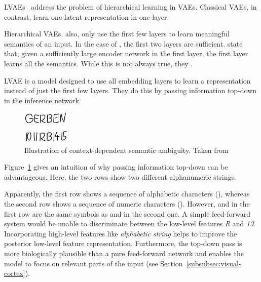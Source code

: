 \aclp{LVAE}~\citep{sonderby2016ladder} address the problem of hierarchical learning in \acp{VAE}.
Classical \acp{VAE}, in contrast, learn one latent representation in one layer.

Hierarchical \acp{VAE}, also, only use the first few layers to learn meaningful semantics of an input.
In the case of \citet{sonderby2016ladder}, the first two layers are sufficient.
\citet{zhao2017learning} state that, given a sufficiently large encoder network in the first layer, the first layer learns all the semantics.
While this is not always true, they .

\ac{LVAE} is a model designed to use all embedding layers to learn a representation instead of just the first few layers.
They do this by passing information top-down in the inference network.
\begin{figure}
    \centering
    \includegraphics[width=0.2\textwidth]{images/gerben.png}
    \caption[Context-Dependent Semantic Ambiguity]{Illustration of context-dependent semantic ambiguity. Taken from \citet[p. 61]{van2016auto}}
    \label{fig:gerben_ambiguity}
\end{figure}
Figure~\ref{fig:gerben_ambiguity} gives an intuition of why passing information top-down can be advantageous.
Here, the two rows show two different alphanumeric strings.

Apparently, the first row shows a sequence of alphabetic characters (), whereas the second row shows a sequence of numeric characters ().
However,  and  in the first row are the same symbols as  and  in the second one.
A simple feed-forward system would be unable to discriminate between the low-level features \textit{R} and \textit{13}.
Incorporating high-level features like \textit{alphabetic string} helps to improve the posterior low-level feature representation.
Furthermore, the top-down pass is more biologically plausible than a pure feed-forward network and enables the model to focus on relevant parts of the input (see Section~\ref{subsubsec:visual-cortex}).


